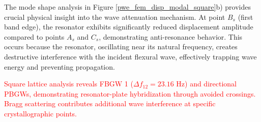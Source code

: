 \documentclass[review,numbers,sort&compress]{elsarticle}
\begin{document}
The mode shape analysis in Figure \ref{pwe_fem_disp_modal_square}b) provides crucial physical insight into the wave attenuation mechanism. At point $B_s$ (first band edge), the resonator exhibits significantly reduced displacement amplitude compared to points $A_s$ and $C_s$, demonstrating anti-resonance behavior. This occurs because the resonator, oscillating near its natural frequency, creates destructive interference with the incident flexural wave, effectively trapping wave energy and preventing propagation. 

\textcolor{red}{Square lattice analysis reveals FBGW 1 ($\Delta f_{12} = 23.16$ Hz) and directional PBGWs, demonstrating resonator-plate hybridization through avoided crossings. Bragg scattering contributes additional wave interference at specific crystallographic points.}
\end{document}
